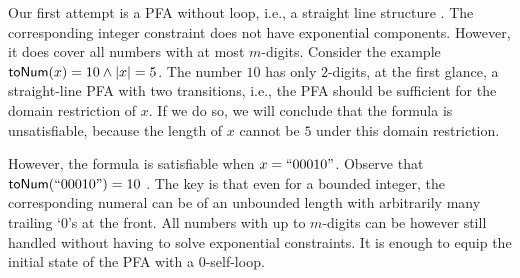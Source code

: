 \documentclass[sigplan,screen]{acmart}
\begin{document}
Our first attempt is a PFA without loop, i.e., a straight line structure 
. The corresponding integer constraint does not have exponential components. However, it does cover all numbers with at most $m$-digits. Consider the example $\mbox{\textsf{toNum}($x$)}=10 \wedge |x|=5$. The number $10$ has only $2$-digits, at the first glance, a straight-line PFA with two transitions, i.e., the PFA
     should be sufficient for the domain restriction of $x$. If we do so, we will conclude that the formula is unsatisfiable, because the length of $x$ cannot be $5$  under this domain restriction.

However, the formula is satisfiable when $x=``00010"$. Observe that $\mbox{\textsf{toNum}($``00010"$)}=10$ . The key is that even for a bounded integer, the corresponding numeral can be of an unbounded length with arbitrarily many trailing `$0$'s at the front. All numbers with up to $m$-digits can be however still handled without having to solve exponential constraints. It is enough to equip the initial state of the PFA with a  $0$-self-loop.
\end{document}
